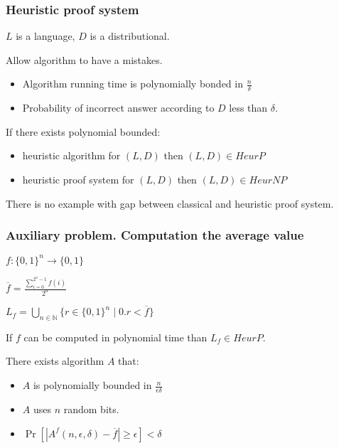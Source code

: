 \begin{frame}
    \frametitle{Heuristic proof system}

    $L$ is a language, $D$ is a distributional.

    Allow algorithm to have a mistakes.

    \begin{itemize}
	    \item Algorithm running time is polynomially bonded in $\frac{n}{\delta}$
    	\item Probability of incorrect answer according to $D$ less than $\delta$.
    \end{itemize}
    
    If there exists polynomial bounded:
    \begin{itemize}
        \item heuristic algorithm for $(L, D)$ then $(L, D) \in HeurP$
	    \item heuristic proof system for $(L, D)$ then $(L, D) \in HeurNP$
    \end{itemize}
    
    \begin{statement}
        There is no example with gap between classical and heuristic proof system.
    \end{statement}
    
\end{frame}

\begin{frame}
    \frametitle{Auxiliary problem. Computation the average value}

    $f:\{0, 1\}^{n} \rightarrow \{0, 1\}$
    
    $\overline{f} = \frac{\sum\limits_{i = 0}^{2^n - 1}f(i)}{2^n}$

    $L_f = \bigcup\limits_{n \in \mathbb{N}}\{r \in \{0, 1\}^n \mid 0.r < \overline{f}\}$

    \begin{lemma}
        If $f$ can be computed in polynomial time than $L_f \in HeurP$.
    \end{lemma}

    \begin{statement}
        There exists algorithm $A$ that:
        \begin{itemize}
	        \item $A$ is polynomially bounded in $\frac{n}{\epsilon\delta}$
        	\item $A$ uses $n$ random bits.
        	\item $\Pr[|A^{f}(n, \epsilon, \delta) - \overline{f}| \ge \epsilon] <
		        \delta$
        \end{itemize}
    \end{statement}
\end{frame}


